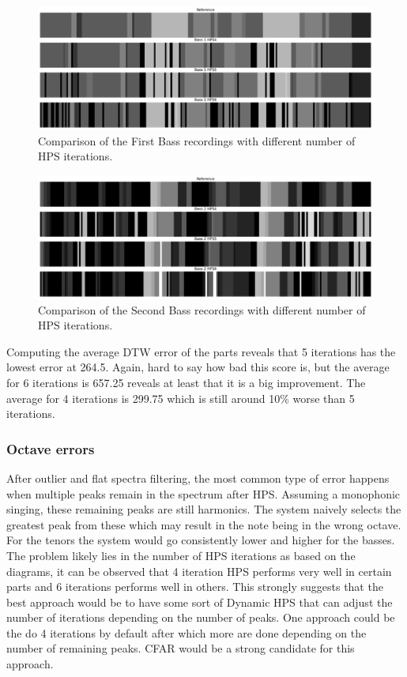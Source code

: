 \begin{figure}[ht]
    \centering
    \includegraphics[width=\textwidth]{./images/hpsBass1.png}
    \caption{Comparison of the First Bass recordings with different number of HPS iterations. \label{fig:hpsBass1}}
\end{figure}


\begin{figure}[ht]
    \centering
    \includegraphics[width=\textwidth]{./images/hpsBass2.png}
    \caption{Comparison of the Second Bass recordings with different number of HPS iterations. \label{fig:hpsBass2}}
\end{figure}

Computing the average DTW error of the parts reveals that 5 iterations has the lowest error at 264.5. Again, hard to say how bad this score is, but the average for 6 iterations is 657.25 reveals at least that it is a big improvement. The average for 4 iterations is 299.75 which is still around 10\% worse than 5 iterations.

\subsubsection{Octave errors}
After outlier and flat spectra filtering, the most common type of error happens when multiple peaks remain in the spectrum after HPS. Assuming a monophonic singing, these remaining peaks are still harmonics. The system naively selects the greatest peak from these which may result in the note being in the wrong octave. For the tenors the system would go consistently lower and higher for the basses. The problem likely lies in the number of HPS iterations as based on the diagrams, it can be observed that 4 iteration HPS performs very well in certain parts and 6 iterations performs well in others. This strongly suggests that the best approach would be to have some sort of Dynamic HPS that can adjust the number of iterations depending on the number of peaks. One approach could be the do 4 iterations by default after which more are done depending on the number of remaining peaks. CFAR would be a strong candidate for this approach.

